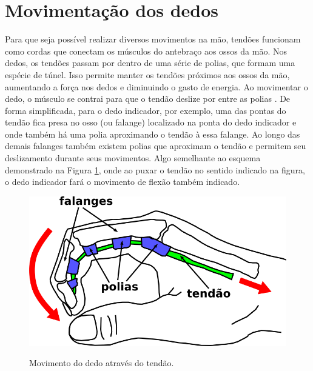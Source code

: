 \documentclass[
	12pt,				%
	openright,			%
	oneside,			%
	a4paper,			%
	english,			%
	brazil				%
	]{abntex2}
\begin{document}
		\section{Movimentação dos dedos} \label{sec:movimentacaodosdedos}


		Para que seja possível realizar diversos movimentos na mão, tendões funcionam como cordas que conectam os músculos do antebraço aos ossos da mão. Nos dedos, os tendões passam por dentro de uma série de polias, que formam uma espécie de túnel. Isso permite manter os tendões próximos aos ossos da mão, aumentando a força nos dedos e diminuindo o gasto de energia. Ao movimentar o dedo, o músculo se contrai para que o tendão deslize por entre as polias \cite{drricardocirurgiao}. De forma simplificada, para o dedo indicador, por exemplo, uma das pontas do tendão fica presa no osso (ou falange) localizado na ponta do dedo indicador e onde também há uma polia aproximando o tendão à essa falange. Ao longo das demais falanges também existem polias que aproximam o tendão e permitem seu deslizamento durante seus movimentos. Algo semelhante ao esquema demonstrado na Figura \ref{Fig:hand-tendon-flex1}, onde ao puxar o tendão no sentido indicado na figura, o dedo indicador fará o movimento de flexão também indicado.



		\begin{figure}[h!]
			\centering
  		\caption{Movimento do dedo através do tendão.}
  		\includegraphics[scale=0.5]{./figures/hand-tendon-flex1.png}
  		\label{Fig:hand-tendon-flex1}
		\end{figure}
\end{document}
